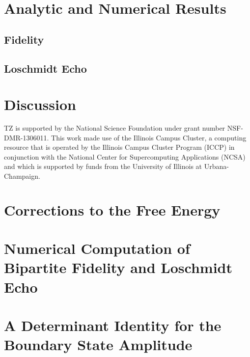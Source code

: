 \documentclass[preprint, prb]{revtex4-1}
\begin{document}
\section{Analytic and Numerical Results}
\subsection{Fidelity}
\subsection{Loschmidt Echo}

\section{Discussion}


\begin{acknowledgments}
    TZ is supported by the National Science Foundation under grant number NSF-DMR-1306011.
    This work made use of the Illinois Campus Cluster, a computing resource that is operated by the
    Illinois Campus Cluster Program (ICCP) in conjunction with the National Center for
    Supercomputing Applications (NCSA) and which is supported by funds from the University of
    Illinois at Urbana-Champaign.
\end{acknowledgments}

\appendix
\section{Corrections to the Free Energy}

\section{Numerical Computation of Bipartite Fidelity and Loschmidt Echo}
\label{app:comp_fid_echo}


\section{A Determinant Identity for the Boundary State Amplitude}
\label{app:pf_of_id}

\end{document}
